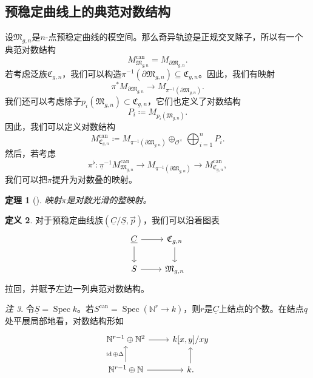 \documentclass{amsart}
\newtheorem{thm}{定理}[section]
\theoremstyle{definition}
\newtheorem{defn}[thm]{定义}
\theoremstyle{remark}
\newtheorem{rmk}[thm]{注}
\theoremstyle{plain}
\theoremstyle{definition}
\theoremstyle{remark}
\newcommand{\N}{\mathbb{N}}
\newcommand{\mc}[1]{\mathcal{#1}}
\newcommand{\mf}[1]{\mathfrak{#1}}
\newcommand{\on}[1]{\operatorname{#1}}
\newcommand{\ul}[1]{\underline{#1}}
\newcommand{\1}{\mathbf{1}}
\newcommand{\2}{\mathbf{2}}
\newcommand{\3}{\mathbf{3}}
\DeclareMathOperator{\Spec}{Spec}
\begin{document}
\subsection{预稳定曲线上的典范对数结构}%
\label{sub:Canonical log structures on prestable curves}

设\(\mf{M}_{g,n}\)是\(n\)-点预稳定曲线的模空间。那么奇异轨迹是正规交叉除子，所以有一个典范对数结构
\[ M_{\mf{M}_{g,n}}^{\on{can}} = M_{\partial \mf{M}_{g,n}}. \]
若考虑泛族\(\mf{C}_{g,n}\)，我们可以构造\(\pi^{-1}(\partial \mf{M}_{g,n}) \subseteq \mf{C}_{g,n}\)。因此，我们有映射
\[ \pi^* M_{\partial \mf{M}_{g,n}} \to M_{\pi^{-1}(\partial \mf{M}_{g,n})}. \]
我们还可以考虑除子\(p_i(\mf{M}_{g,n}) \subset \mf{C}_{g,n}\)，它们也定义了对数结构
\[ P_i \coloneqq M_{p_i(\mf{M}_{g,n})}. \]
因此，我们可以定义对数结构
\[ M_{\mf{C}_{g,n}}^{\on{can}} \coloneqq M_{\pi^{-1}(\partial\mf{M}_{g,n})} \oplus_{\mc{O}^{\times}} \bigoplus_{i=1}^n P_i. \]
然后，若考虑
\[ \pi^{\flat} \colon \ul{\pi}^{-1} M_{\mf{M}_{g,n}}^{\on{can}} \to M_{\pi^{-1}(\partial \mf{M}_{g,n})} \to M_{\mf{C}_{g,n}}^{\on{can}}, \]
我们可以把\(\pi\)提升为对数叠的映射。

\begin{thm}[{\cite{FKato2000}}]
    映射\(\pi\)是对数光滑的整映射。
\end{thm}

\begin{defn}
    对于预稳定曲线族\((\ul{C}/\ul{S}, \vec{p})\)，我们可以沿着图表
    \begin{equation*}
    \begin{tikzcd}
        \ul{C} \ar{r} \ar{d} & \mf{C}_{g,n} \ar{d} \\
        S \ar{r} & \mf{M}_{g,n}
    \end{tikzcd}
    \end{equation*}
    拉回，并赋予左边一列典范对数结构。
\end{defn}

\begin{rmk}
    令\(\ul{S} = \Spec k\)。若\(S^{\on{can}} = \Spec (\N^r \to k)\)，则\(r\)是\(\ul{C}\)上结点的个数。在结点\(q\)处平展局部地看，对数结构形如
    \begin{equation*}
    \begin{tikzcd}
        \N^{r-1} \oplus \N^2 \ar{r} & k[x,y]/xy \\
        \N^{r-1} \oplus \N \ar{u}{\on{id}\oplus\Delta} \ar{r} & k \ar{u}.
    \end{tikzcd}
    \end{equation*}
\end{rmk}
\end{document}
